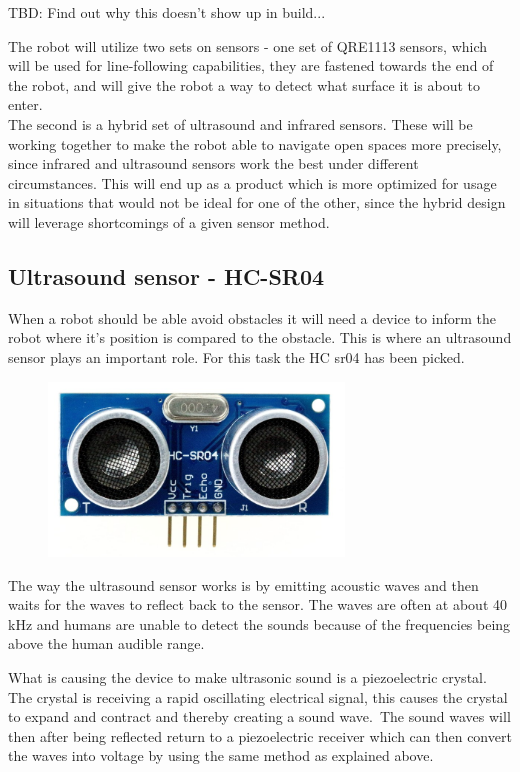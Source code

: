 TBD: Find out why this doesn't show up in build...

The robot will utilize two sets on sensors - one set of QRE1113 sensors, which will be used for line-following capabilities, they are fastened towards the end of the robot, and will give the robot a way to detect what surface it is about to enter.\\
The second is a hybrid set of ultrasound and infrared sensors. These will be working together to make the robot able to navigate open spaces more precisely, since infrared and ultrasound sensors work the best under different circumstances. This will end up as a product which is more optimized for usage in situations that would not be ideal for one of the other, since the hybrid design will leverage shortcomings of a given sensor method.\\

\subsection{Ultrasound sensor - HC-SR04}
When a robot should be able avoid obstacles it will need a device to inform the robot where it's position is compared to the obstacle. This is where an ultrasound sensor plays an important role. For this task the HC sr04 has been picked.\\

\begin{figure}[!ht]
	\centering
	\includegraphics[width=0.7\textwidth]{figures/hc04.jpg}
	\caption{}
	\label{Hardware diagram}
\end{figure}


The way the ultrasound sensor works is by emitting acoustic waves and then waits for the waves to reflect back to the sensor. The waves are often at about 40 kHz and humans are unable to detect the sounds because of the frequencies being above the human audible range.\

What is causing the device to make ultrasonic sound is a piezoelectric crystal. The crystal is receiving a rapid oscillating electrical signal, this causes the crystal to expand and contract and thereby creating a sound wave.\ The sound waves will then after being reflected return to a piezoelectric receiver which can then convert the waves into voltage by using the same method as explained above. \\


